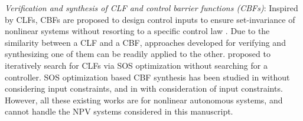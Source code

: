 {\it Verification and synthesis of CLF and control barrier functions (CBFs)}: Inspired by CLFs, CBFs are proposed to design control inputs to ensure set-invariance of nonlinear systems without resorting to a specific control law \cite{ames2016cbf-tac}. Due to the similarity between a CLF and a CBF, approaches developed for verifying and synthesizing one of them can be readily applied to the other.  \cite{tan2004searching-clf-sos} proposed to iteratively search for CLFs via SOS optimization without searching for a controller. %
SOS optimization based CBF synthesis has been studied in   \cite{wang2018permissive-sos, clark2021verification} without considering input constraints, and in \cite{dai2022convex-clf-cbf,zhao2023convex-cbf} with consideration of input constraints. 
However, all these existing works are for nonlinear autonomous systems, and cannot handle the NPV systems considered in this manuscript. 

%